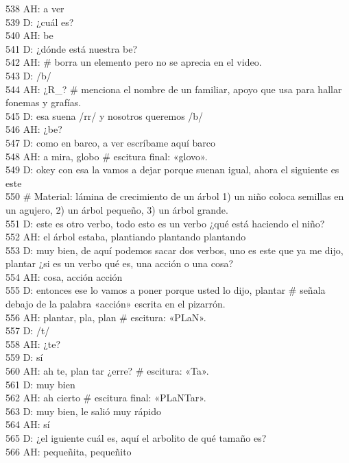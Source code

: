 538 AH: a ver\\
539 D: ¿cuál es?\\
540 AH: be\\
541 D: ¿dónde está nuestra be?\\
542 AH: \# borra un elemento pero no se aprecia en el video.\\
543 D: /b/\\
544 AH: ¿R\_? \# menciona el nombre de un familiar, apoyo que usa para hallar fonemas y grafías.\\
545 D: esa suena /rr/ y nosotros queremos /b/\\
546 AH: ¿be?\\
547 D: como en barco, a ver escríbame aquí barco\\
548 AH: a mira, globo \# escitura final: «glovo».\\
549 D: okey con esa la vamos a dejar porque suenan igual, ahora el siguiente es este \\
550 \# Material: lámina de crecimiento de un árbol 1) un niño coloca semillas en un agujero, 2) un árbol pequeño, 3) un árbol grande.\\
551 D: este es otro verbo, todo esto es un verbo ¿qué está haciendo el niño?\\
552 AH: el árbol estaba, plantiando plantando plantando\\
553 D: muy bien, de aquí podemos sacar dos verbos, uno es este que ya me dijo, plantar ¿si es un verbo qué es, una acción o una cosa?\\
554 AH: cosa, acción acción\\
555 D: entonces ese lo vamos a poner porque usted lo dijo, plantar \# señala debajo de la palabra «acción» escrita en el pizarrón.\\
556 AH: plantar, pla, plan \# escitura: «PLaN».\\
557 D: /t/\\
558 AH: ¿te?\\
559 D: sí\\
560 AH: ah te, plan tar ¿erre? \# escitura: «Ta».\\
561 D: muy bien\\
562 AH: ah cierto \# escitura final: «PLaNTar».\\
563 D: muy bien, le salió muy rápido\\
564 AH: sí\\
565 D: ¿el iguiente cuál es, aquí el arbolito de qué tamaño es?\\
566 AH: pequeñita, pequeñito\\
